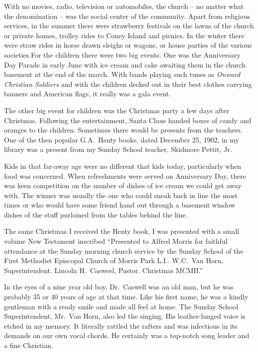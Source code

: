 \documentclass[12pt]{book}              %
\begin{document}
With no movies, radio, television or automobiles, the church -- no matter what the denomination -- was the social center of the community. Apart from religious services, in the summer there were strawberry festivals on the lawns of the church or private homes, trolley rides to Coney Island and picnics. In the winter there were straw rides in horse drawn sleighs or wagons, or house parties of the various societies.For the children there were two big events. One was the Anniversary Day Parade in early June with ice cream and cake awaiting them in the church basement at the end of the march. With bands playing such tunes as {\it Onward Christian Soldiers} and with the children decked out in their best clothes carrying banners and American flags, it really was a gala event. 

The other big event for children was the Christmas party a few days after Christmas. Following the entertainment, Santa Claus handed boxes of candy and oranges to the children. Sometimes there would be presents from the teachers. One of the then popular G.A.~Henty books, dated December 25, 1902, in my library was a present from my Sunday School teacher, Skidmore Pettit, Jr. 

Kids in that far-away age were no different that kids today, particularly when food was concerned. When refreshments were served on Anniversary Day, there was keen competition on the number of dishes of ice cream we could get away with. The winner was usually the one who could sneak back in line the most times or who would have some friend hand out through a basement window dishes of the stuff purloined from the tables behind the line. 

The same Christmas I received the Henty book, I was presented with a small volume New Testament inscribed ``Presented to Alfred Morris for faithful attendance at the Sunday morning church service by the Sunday School of the First Methodist Episcopal Church of Morris Park L.I.. W.C.~Van Horn, Superintendent. Lincoln H.~Casweel, Pastor. Christmas MCMII.'' 

In the eyes of a nine year old boy, Dr.~Caswell was an old man, but he was probably 35 or 40 years of age at that time. Like his first name, he was a kindly gentleman with a ready smile and made all feel at home. The Sunday School Superintendent, Mr.~Van Horn, also led the singing. His leather-lunged voice is etched in my memory. It literally rattled the rafters and was infectious in its demands on our own vocal chords. He certainly was a top-notch song leader and a fine Christian. 
\end{document}
